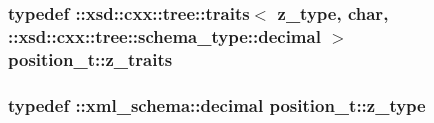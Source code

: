 \hypertarget{classposition__t_a96e8127d6eb9e048cb8f26ec77f06cd1}{
\subsubsection[{z\-\_\-traits}]{\setlength{\rightskip}{0pt plus 5cm}typedef \-::xsd\-::cxx\-::tree\-::traits$<$ {\bf z\-\_\-type}, char, \-::xsd\-::cxx\-::tree\-::schema\-\_\-type\-::decimal $>$ {\bf position\-\_\-t\-::z\-\_\-traits}}}\label{classposition__t_a96e8127d6eb9e048cb8f26ec77f06cd1}
\hypertarget{classposition__t_ab6171c246c19584481804a5e2da8561f}{
\subsubsection[{z\-\_\-type}]{\setlength{\rightskip}{0pt plus 5cm}typedef \-::{\bf xml\-\_\-schema\-::decimal} {\bf position\-\_\-t\-::z\-\_\-type}}}\label{classposition__t_ab6171c246c19584481804a5e2da8561f}


